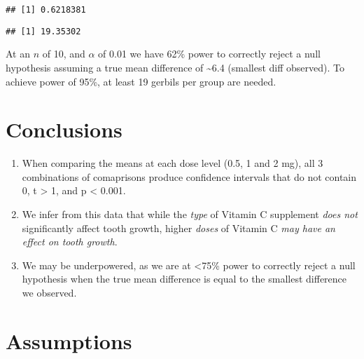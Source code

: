 \documentclass[]{article}
\newenvironment{Shaded}{\begin{snugshade}}{\end{snugshade}}
\newcommand{\KeywordTok}[1]{\textcolor[rgb]{0.13,0.29,0.53}{\textbf{{#1}}}}
\newcommand{\DataTypeTok}[1]{\textcolor[rgb]{0.13,0.29,0.53}{{#1}}}
\newcommand{\FloatTok}[1]{\textcolor[rgb]{0.00,0.00,0.81}{{#1}}}
\newcommand{\StringTok}[1]{\textcolor[rgb]{0.31,0.60,0.02}{{#1}}}
\newcommand{\NormalTok}[1]{{#1}}
\begin{document}
\begin{verbatim}
## [1] 0.6218381
\end{verbatim}

\begin{Shaded}
\end{Shaded}

\begin{verbatim}
## [1] 19.35302
\end{verbatim}

At an \(n\) of 10, and \(\alpha\) of 0.01 we have 62\% power to
correctly reject a null hypothesis assuming a true mean difference of
\textasciitilde{}6.4 (smallest diff observed). To achieve power of 95\%,
at least 19 gerbils per group are needed.

\section{Conclusions}\label{conclusions}

\begin{enumerate}
\def\labelenumi{\arabic{enumi}.}
\itemsep1pt\parskip0pt
\item
  When comparing the means at each dose level (0.5, 1 and 2 mg), all 3
  combinations of comaprisons produce confidence intervals that do not
  contain 0, t \textgreater{} 1, and p \textless{} 0.001.
\item
  We infer from this data that while the \emph{type} of Vitamin C
  supplement \emph{does not} significantly affect tooth growth, higher
  \emph{doses} of Vitamin C \emph{may have an effect on tooth growth}.
\item
  We may be underpowered, as we are at \textless{}75\% power to
  correctly reject a null hypothesis when the true mean difference is
  equal to the smallest difference we observed.
\end{enumerate}

\section{Assumptions}\label{assumptions}
\end{document}
